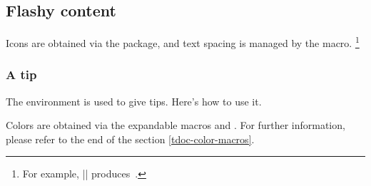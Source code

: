 \documentclass[10pt, a4paper]{article}
\begin{document}
\subsection{Flashy content} \label{tdoc-colorful-focus}

\begin{tdocnote}
    Icons are obtained via the  package, and text spacing is managed by the  macro.
    \footnote{
        For example,
        \tdocinlatex||
        produces\,
        .
    }
\end{tdocnote}


\subsubsection{A tip}

The  environment is used to give tips. Here's how to use it.



\smallskip

\begin{tdocnote}
    Colors are obtained via the expandable macros  and .
    For further information, please refer to the end of the section \ref{tdoc-color-macros}.
\end{tdocnote}
\end{document}

